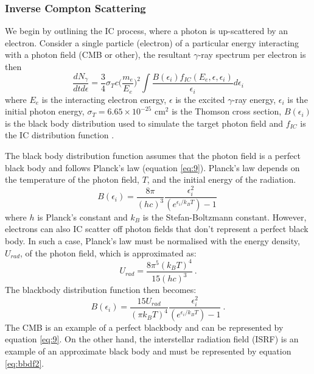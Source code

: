 \documentclass[12pt,a4paper]{article}
\begin{document}
\subsubsection{Inverse Compton Scattering}
We begin by outlining the IC process, where a photon is up-scattered by an electron. Consider a single particle (electron) of a particular energy interacting with a photon field (CMB or other), the resultant $\gamma$-ray spectrum per electron is then
\begin{equation} \label{eq:8}
\dfrac{dN_{\gamma}}{dtd\epsilon} = \dfrac{3}{4} \sigma_T c \bigg(\dfrac{m_e}{E_e}\bigg)^2 \int \dfrac{B(\epsilon_i) f_{IC}(E_e, \epsilon, \epsilon_i)}{\epsilon_i} d\epsilon_i
\end{equation} 
where $E_e$ is the interacting electron energy, $\epsilon$ is the excited $\gamma$-ray energy, $\epsilon_i$ is the initial photon energy, $\sigma_T = 6.65 \times 10^{-25}$ cm$^2$ is the Thomson cross section, $B(\epsilon_i)$ is the black body distribution used to simulate the target photon field  and $f_{IC}$ is the IC distribution function \citep{2010A&A...523A...2M, 1970RvMP...42..237B,2007A&A...474..689M}. 

The black body distribution function assumes that the photon field is a perfect black body and follows Planck's law (equation \ref{eq:9}). Planck's law depends on the temperature of the photon field, $T$, and the initial energy of the radiation. 
\begin{equation} \label{eq:9}
B(\epsilon_i) = \dfrac{8\pi}{(hc)^3}\dfrac{\epsilon_i^2}{(e^{\epsilon_i/k_BT}) - 1} \ 
\end{equation}
where $h$ is Planck's constant and $k_B$ is the Stefan-Boltzmann constant. However, electrons can also IC scatter off photon fields that don't represent a perfect black body. In such a case, Planck's law must be normalised with the energy density, $U_{rad}$, of the photon field, which is approximated as:
\begin{equation}
U_{rad} = \dfrac{8 \pi^5 (k_B T)^4}{15(hc)^3} \ .
\end{equation}
The blackbody distribution function then becomes:
\begin{equation} \label{eq:bbdf2}
B(\epsilon_i) = \dfrac{15 U_{rad}}{(\pi k_B T)^4}\dfrac{ \epsilon_i^2}{ (e^{\epsilon_i/k_BT}) - 1} \ .
\end{equation}
The CMB is an example of a perfect blackbody and can be represented by equation \ref{eq:9}. On the other hand, the interstellar radiation field (ISRF) is an example of an approximate black body and must be represented by equation \ref{eq:bbdf2}.
\end{document}
